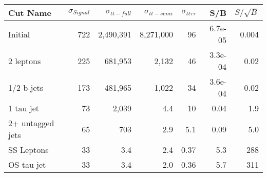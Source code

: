 \begin{tabular}{lrrrrrr}
\toprule
         Cut Name &  $\sigma_{Signal}$ &  $\sigma_{tt-full}$ &  $\sigma_{tt-semi}$ &  $\sigma_{tt\tau\tau}$ &     S/B &  $S/\sqrt{B}$ \\
\midrule
          Initial &                722 &           2,490,391 &           8,271,000 &                     96 & 6.7e-05 &         0.004 \\
        2 leptons &                225 &             681,953 &               2,132 &                     46 & 3.3e-04 &          0.02 \\
       1/2 b-jets &                173 &             481,965 &               1,022 &                     34 & 3.6e-04 &          0.02 \\
        1 tau jet &                 73 &               2,039 &                 4.4 &                     10 &    0.04 &           1.9 \\
 2+ untagged jets &                 65 &                 703 &                 2.9 &                    5.1 &    0.09 &           5.0 \\
       SS Leptons &                 33 &                 3.4 &                 2.4 &                   0.37 &     5.3 &           288 \\
       OS tau jet &                 33 &                 3.4 &                 2.0 &                   0.36 &     5.7 &           311 \\
\bottomrule
\end{tabular}
